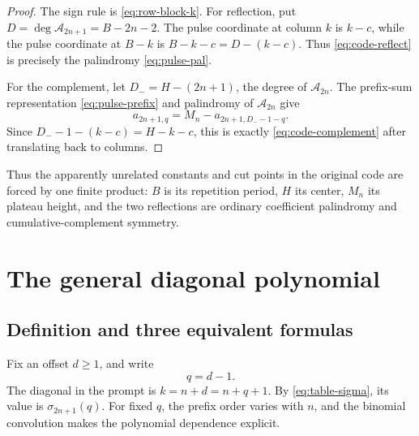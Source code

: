 \documentclass[11pt]{article}
\theoremstyle{definition}
\theoremstyle{remark}
\newcommand{\A}{\mathcal A}
\begin{document}
\begin{proof}
The sign rule is \cref{eq:row-block-k}.  For reflection, put
\(D=\deg\A_{2n+1}=B-2n-2\).  The pulse coordinate at column \(k\) is
\(k-c\), while the pulse coordinate at \(B-k\) is
\(B-k-c=D-(k-c)\).  Thus \cref{eq:code-reflect} is precisely the
palindromy \cref{eq:pulse-pal}.

For the complement, let \(D_-=H-(2n+1)\), the degree of
\(\A_{2n}\).  The prefix-sum representation \cref{eq:pulse-prefix} and
palindromy of \(\A_{2n}\) give
\[
 a_{2n+1,q}=M_n-a_{2n+1,D_--1-q}.
\]
Since \(D_--1-(k-c)=H-k-c\), this is exactly
\cref{eq:code-complement} after translating back to columns.
\end{proof}

Thus the apparently unrelated constants and cut points in the original code
are forced by one finite product: \(B\) is its repetition period,
\(H\) its center, \(M_n\) its plateau height, and the two reflections are
ordinary coefficient palindromy and cumulative-complement symmetry.

\section{The general diagonal polynomial}

\subsection{Definition and three equivalent formulas}

Fix an offset \(d\geq1\), and write
\begin{equation}
 q=d-1.                                                      \label{eq:q-d}
\end{equation}
The diagonal in the prompt is \(k=n+d=n+q+1\).  By
\cref{eq:table-sigma}, its value is \(\sigma_{2n+1}(q)\).  For fixed \(q\),
the prefix order varies with \(n\), and the binomial convolution makes the
polynomial dependence explicit.
\end{document}
